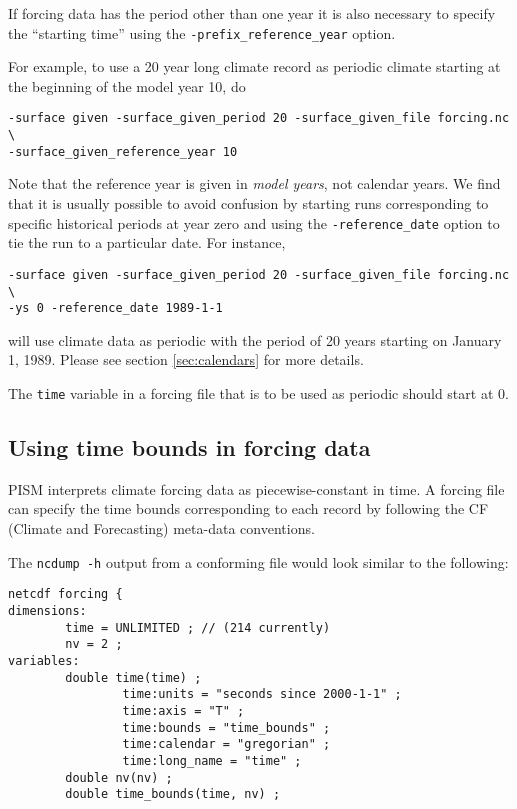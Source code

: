 \documentclass[titlepage,letterpaper,final]{scrartcl}
\begin{document}
If forcing data has the period other than one year it is also
necessary to specify the ``starting time'' using the
\texttt{-prefix_reference_year} option.

For example, to use a 20 year long climate record as periodic climate starting
at the beginning of the model year 10, do
\begin{verbatim}
-surface given -surface_given_period 20 -surface_given_file forcing.nc \
-surface_given_reference_year 10
\end{verbatim}

Note that the reference year is given in \emph{model years}, not calendar
years. We find that it is usually possible to avoid confusion by starting runs
corresponding to specific historical periods at year zero and using the
\texttt{-reference_date} option to tie the run to a particular date. For instance,
\begin{verbatim}
-surface given -surface_given_period 20 -surface_given_file forcing.nc \
-ys 0 -reference_date 1989-1-1
\end{verbatim}
will use climate data as periodic with the period of 20 years starting on
January 1, 1989. Please see section \ref{sec:calendars} for more details.

The \texttt{time} variable in a forcing file that is to be used as periodic
should start at $0$.

\subsection{Using time bounds in forcing data}
\label{sec:time-bounds}

PISM interprets climate  forcing data as piecewise-constant in  time. A forcing
file can specify the time bounds  corresponding to each record by following the
CF (Climate and Forecasting) meta-data conventions.

The \texttt{ncdump -h} output from a conforming file would look similar to the
following:
\begin{verbatim}
netcdf forcing {
dimensions:
        time = UNLIMITED ; // (214 currently)
        nv = 2 ;
variables:
        double time(time) ;
                time:units = "seconds since 2000-1-1" ;
                time:axis = "T" ;
                time:bounds = "time_bounds" ;
                time:calendar = "gregorian" ;
                time:long_name = "time" ;
        double nv(nv) ;
        double time_bounds(time, nv) ;
\end{verbatim}
\end{document}
